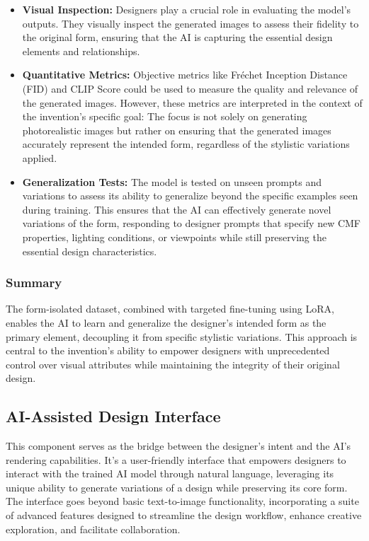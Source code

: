 \documentclass[12pt]{report}
\begin{document}
\begin{itemize}
    \item \textbf{Visual Inspection:} Designers play a crucial role in evaluating the model's outputs. They visually inspect the generated images to assess their fidelity to the original form, ensuring that the AI is capturing the essential design elements and relationships.
    \item \textbf{Quantitative Metrics:} Objective metrics like Fréchet Inception Distance (FID) and CLIP Score could be used to measure the quality and relevance of the generated images. However, these metrics are interpreted in the context of the invention's specific goal: The focus is not solely on generating photorealistic images but rather on ensuring that the generated images accurately represent the intended form, regardless of the stylistic variations applied.
    \item \textbf{Generalization Tests:} The model is tested on unseen prompts and variations to assess its ability to generalize beyond the specific examples seen during training. This ensures that the AI can effectively generate novel variations of the form, responding to designer prompts that specify new CMF properties, lighting conditions, or viewpoints while still preserving the essential design characteristics.
\end{itemize}

\subsubsection{Summary}
The form-isolated dataset, combined with targeted fine-tuning using LoRA, enables the AI to learn and generalize the designer's intended form as the primary element, decoupling it from specific stylistic variations. This approach is central to the invention's ability to empower designers with unprecedented control over visual attributes while maintaining the integrity of their original design.

\subsection{AI-Assisted Design Interface}

This component serves as the bridge between the designer's intent and the AI's rendering capabilities. It's a user-friendly interface that empowers designers to interact with the trained AI model through natural language, leveraging its unique ability to generate variations of a design while preserving its core form. The interface goes beyond basic text-to-image functionality, incorporating a suite of advanced features designed to streamline the design workflow, enhance creative exploration, and facilitate collaboration.
\end{document}
